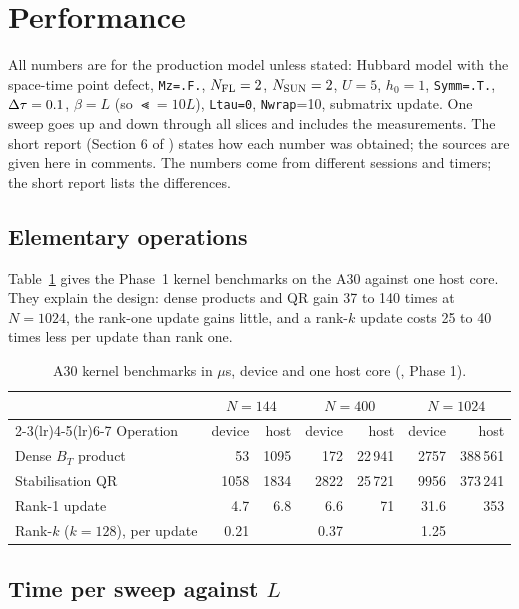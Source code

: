 \section{Performance}
\label{sec:perf}

All numbers are for the production model unless stated: Hubbard model with the space-time point defect, \texttt{Mz=.F.}, $N_{\rm FL}=2$, $N_{\rm SUN}=2$, $U=5$, $h_0=1$, \texttt{Symm=.T.}, $\Delta\tau=0.1$, $\beta=L$ (so $\Lt=10L$), \texttt{Ltau=0}, \texttt{Nwrap}=10, submatrix update. One sweep goes up and down through all slices and includes the measurements. The short report (Section 6 of ) states how each number was obtained; the sources are given here in comments. The numbers come from different sessions and timers; the short report lists the differences.

\subsection{Elementary operations}

Table~\ref{tab:kernels} gives the Phase~1 kernel benchmarks on the A30 against one host core. They explain the design: dense products and QR gain 37 to 140 times at $N=1024$, the rank-one update gains little, and a rank-$k$ update costs 25 to 40 times less per update than rank one.

\begin{table}[h]
\centering\small
\caption{A30 kernel benchmarks in $\mu$s, device and one host core (, Phase 1).}
\label{tab:kernels}
\begin{tabular}{@{}lrrrrrr@{}}
\toprule
 & \multicolumn{2}{c}{$N=144$} & \multicolumn{2}{c}{$N=400$} & \multicolumn{2}{c}{$N=1024$}\\
\cmidrule(lr){2-3}\cmidrule(lr){4-5}\cmidrule(lr){6-7}
Operation & device & host & device & host & device & host \\
\midrule
Dense $B_T$ product & 53 & 1095 & 172 & 22\,941 & 2757 & 388\,561 \\ %
Stabilisation QR & 1058 & 1834 & 2822 & 25\,721 & 9956 & 373\,241 \\
Rank-1 update & 4.7 & 6.8 & 6.6 & 71 & 31.6 & 353 \\
Rank-$k$ ($k=128$), per update & 0.21 & & 0.37 & & 1.25 & \\
\bottomrule
\end{tabular}
\end{table}

\subsection{Time per sweep against $L$}

